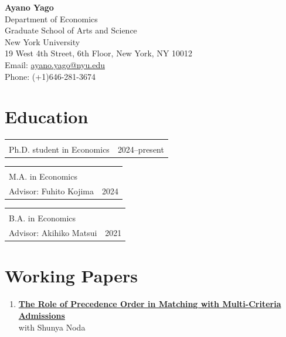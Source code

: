 \documentclass[11pt,letterpaper]{article}
\makeatletter
\newcommand{\cventry}[2]{%
  \begin{tabularx}{\textwidth}{@{}X r@{}}
    \begin{minipage}[t]{\linewidth}#1\end{minipage} & #2
  \end{tabularx}%
}
\makeatother
\begin{document}
\thispagestyle{cvfirstpage}

\begin{center}
  {\LARGE\bfseries Ayano Yago}\\[8pt]
  Department of Economics\\
  Graduate School of Arts and Science\\
  New York University\\[3pt]
  19 West 4th Street, 6th Floor, New York, NY 10012\\[3pt]
  Email: \href{mailto:ayano.yago@nyu.edu}{ayano.yago@nyu.edu}\\[3pt]
  Phone: (+1)646-281-3674
\end{center}

\vspace{5pt}

\section*{Education}

\cventry{
  \textbf{New York University}\\
  Ph.D. student in Economics
}{2024--present}

\vspace{5pt}

\cventry{
  \textbf{The University of Tokyo}\\
  M.A. in Economics\\
  Advisor: Fuhito Kojima
}{2024}

\vspace{5pt}

\cventry{
  \textbf{The University of Tokyo}\\
  B.A. in Economics\\
  Advisor: Akihiko Matsui
}{2021}



\section*{Working Papers}

\begin{enumerate}[leftmargin=1.5em, itemsep=8pt]

\item
\textbf{\href{https://arxiv.org/abs/2607.29139}{The Role of Precedence Order in Matching with Multi-Criteria Admissions}}\\
with Shunya Noda

\end{enumerate}
\end{document}
